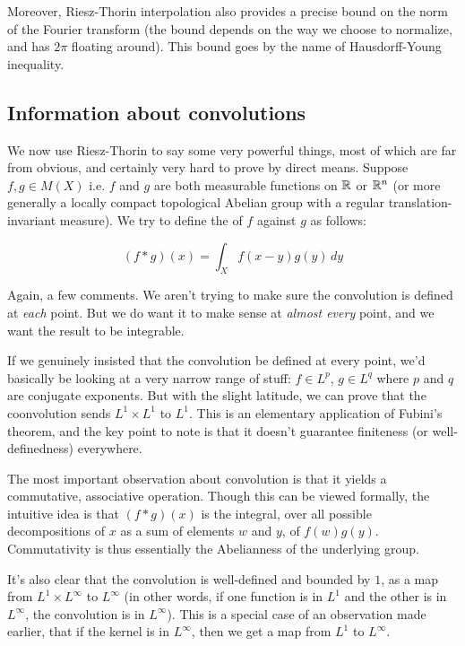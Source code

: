 \documentclass[a4paper]{amsart}
\begin{document}
Moreover, Riesz-Thorin interpolation also provides a precise bound on
the norm of the Fourier transform (the bound depends on the way we
choose to normalize, and has $2\pi$ floating around). This bound goes
by the name of Hausdorff-Young inequality.

\subsection{Information about convolutions}

We now use Riesz-Thorin to say some very powerful things, most of
which are far from obvious, and certainly very hard to prove by direct
means. Suppose $f,g \in M(X)$ i.e. $f$ and $g$ are both measurable
functions on $\mathbb{R}$ or $\mathbb{R}^n$ (or more generally a locally compact
topological Abelian group with a regular translation-invariant
measure). We try to define the  of $f$ against
$g$ as follows:

$$(f * g)(x) = \int_X f(x-y) g(y) \, dy$$

Again, a few comments. We aren't trying to make sure the convolution
is defined at {\em each} point. But we do want it to make sense at
{\em almost every} point, and we want the result to be integrable.

If we genuinely insisted that the convolution be defined at every
point, we'd basically be looking at a very narrow range of stuff: $f
\in L^p$, $g \in L^q$ where $p$ and $q$ are conjugate exponents. But
with the slight latitude, we can prove that the coonvolution sends
$L^1 \times L^1$ to $L^1$. This is an elementary application of
Fubini's theorem, and the key point to note is that it doesn't
guarantee finiteness (or well-definedness) everywhere.

The most important observation about convolution is that it yields a
commutative, associative operation. Though this can be viewed
formally, the intuitive idea is that $(f * g)(x)$ is the integral, over
all possible decompositions of $x$ as a sum of elements $w$ and $y$,
of $f(w) g(y)$. Commutativity is thus essentially the Abelianness of the underlying group.

It's also clear that the convolution is well-defined and bounded by
$1$, as a map from $L^1 \times L^\infty$ to $L^\infty$ (in other words, if one
function is in $L^1$ and the other is in $L^\infty$, the convolution
is in $L^\infty$). This is a special case of an observation made
earlier, that if the kernel is in $L^\infty$, then we get a map from
$L^1$ to $L^\infty$.
\end{document}
